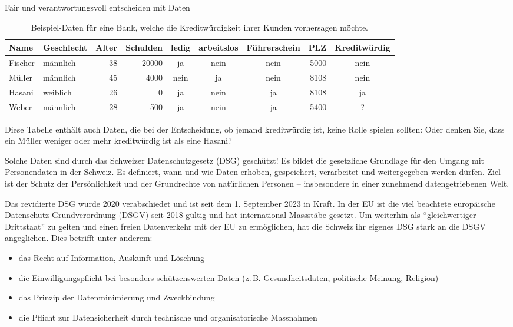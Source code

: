 \begin{lpu}{Fair und verantwortungsvoll entscheiden mit Daten}
\begin{table}[h]
\begin{tabularx}{0.6\textwidth}{|l|l|r|r|c|c|c|r|c|}
\hline
\textbf{Name} & \textbf{Geschlecht} & \textbf{Alter} & \textbf{Schulden} & \textbf{ledig} & \textbf{arbeitslos} & \textbf{Führerschein} & \textbf{PLZ} & \textbf{Kreditwürdig} \\
\hline
Fischer & männlich & 38 & 20000 & ja & nein & nein & 5000 & nein \\
Müller  & männlich & 45 & 4000  & nein & ja & nein & 8108 & nein \\
Hasani  & weiblich & 26 & 0     & ja & nein & ja & 8108 & ja \\
Weber   & männlich & 28 & 500   & ja & nein & ja & 5400 & \cellcolor{orange}? \\
\hline
\end{tabularx}
\caption{Beispiel-Daten für eine Bank, welche die Kreditwürdigkeit ihrer Kunden vorhersagen möchte.}
\end{table}

Diese Tabelle enthält auch Daten, die bei der Entscheidung, ob jemand kreditwürdig ist, keine Rolle spielen sollten: Oder denken Sie, dass ein Müller weniger oder mehr kreditwürdig ist als eine Hasani?

\begin{theorie}
Solche Daten sind durch das Schweizer Datenschutzgesetz (DSG) geschützt! Es bildet die gesetzliche Grundlage für den Umgang mit Personendaten in der Schweiz. Es definiert, wann und wie Daten erhoben, gespeichert, verarbeitet und weitergegeben werden dürfen. Ziel ist der Schutz der Persönlichkeit und der Grundrechte von natürlichen Personen – insbesondere in einer zunehmend datengetriebenen Welt.

Das revidierte DSG wurde 2020 verabschiedet und ist seit dem 1. September 2023 in Kraft. In der EU ist die viel beachtete europäische Datenschutz-Grundverordnung (DSGV) seit 2018 gültig und hat international Massstäbe gesetzt. Um weiterhin als ``gleichwertiger Drittstaat'' zu gelten und einen freien Datenverkehr mit der EU zu ermöglichen, hat die Schweiz ihr eigenes DSG stark an die DSGV angeglichen. Dies betrifft unter anderem:

\begin{itemize}
  \item das Recht auf Information, Auskunft und Löschung
  \item die Einwilligungspflicht bei besonders schützenswerten Daten (z. B. Gesundheitsdaten, politische Meinung, Religion)
  \item das Prinzip der Datenminimierung und Zweckbindung
  \item die Pflicht zur Datensicherheit durch technische und organisatorische Massnahmen
\end{itemize}
\end{theorie}


\end{lpu}
